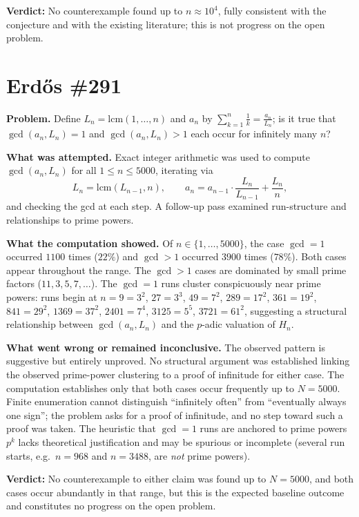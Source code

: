 \documentclass[11pt]{article}
\begin{document}
\textbf{Verdict:} No counterexample found up to $n \approx 10^{4}$, fully consistent with
the conjecture and with the existing literature; this is not progress on the open problem.

\clearpage

\section{Erd\H{o}s \#291}

\textbf{Problem.} Define $L_n = \mathrm{lcm}(1,\dots,n)$ and $a_n$ by
$\sum_{k=1}^{n} \frac{1}{k} = \frac{a_n}{L_n}$;
is it true that $\gcd(a_n, L_n) = 1$ and $\gcd(a_n, L_n) > 1$ each occur for infinitely many $n$?

\textbf{What was attempted.} Exact integer arithmetic was used to compute $\gcd(a_n, L_n)$ for all $1 \le n \le 5000$, iterating via
\[
  L_n = \mathrm{lcm}(L_{n-1}, n), \qquad
  a_n = a_{n-1} \cdot \frac{L_n}{L_{n-1}} + \frac{L_n}{n},
\]
and checking the gcd at each step. A follow-up pass examined run-structure and relationships to prime powers.

\textbf{What the computation showed.} Of $n \in \{1,\dots,5000\}$, the case $\gcd = 1$ occurred $1100$ times ($22\%$) and $\gcd > 1$ occurred $3900$ times ($78\%$). Both cases appear throughout the range. The $\gcd > 1$ cases are dominated by small prime factors ($11, 3, 5, 7, \dots$). The $\gcd = 1$ runs cluster conspicuously near prime powers: runs begin at $n = 9 = 3^2$, $27 = 3^3$, $49 = 7^2$, $289 = 17^2$, $361 = 19^2$, $841 = 29^2$, $1369 = 37^2$, $2401 = 7^4$, $3125 = 5^5$, $3721 = 61^2$, suggesting a structural relationship between $\gcd(a_n, L_n)$ and the $p$-adic valuation of $H_n$.

\textbf{What went wrong or remained inconclusive.} The observed pattern is suggestive but entirely unproved. No structural argument was established linking the observed prime-power clustering to a proof of infinitude for either case. The computation establishes only that both cases occur frequently up to $N = 5000$. Finite enumeration cannot distinguish ``infinitely often'' from ``eventually always one sign''; the problem asks for a proof of infinitude, and no step toward such a proof was taken. The heuristic that $\gcd = 1$ runs are anchored to prime powers $p^k$ lacks theoretical justification and may be spurious or incomplete (several run starts, e.g.\ $n = 968$ and $n = 3488$, are \emph{not} prime powers).

\textbf{Verdict:} No counterexample to either claim was found up to $N = 5000$, and both cases occur abundantly in that range, but this is the expected baseline outcome and constitutes no progress on the open problem.
\end{document}
